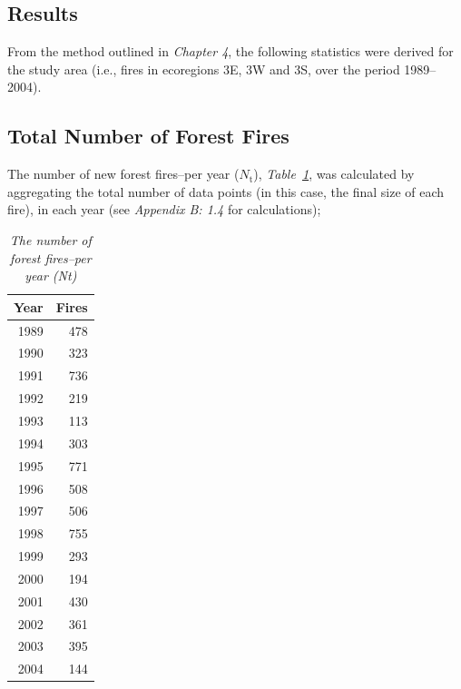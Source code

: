 \begin{spacing}{1.5}
\phantom
\phantom
\phantom
\phantom
\section{Results}
\phantom
\phantom
\noindent From the method outlined in \emph{Chapter 4}, the following statistics were derived for the study area (i.e., fires in ecoregions 3E, 3W and 3S, over the period 1989--2004).

\subsection{Total Number of Forest Fires}

The number of new forest fires--per year ($N_{\mathrm{t}}$), \emph{Table~\ref{tab3}}, was calculated by aggregating the total number of data points (in this case, the final size of each fire), in each year (see \emph{Appendix B: 1.4} for calculations); \\





\begin{table}[ht]
\begin{center}
\begin{tabular}{|r|r|}
  \hline
Year & Fires \\ 
  \hline
1989 & 478 \\ 
  1990 & 323 \\ 
  1991 & 736 \\ 
  1992 & 219 \\ 
  1993 & 113 \\ 
  1994 & 303 \\ 
  1995 & 771 \\ 
  1996 & 508 \\ 
  1997 & 506 \\ 
  1998 & 755 \\ 
  1999 & 293 \\ 
  2000 & 194 \\ 
  2001 & 430 \\ 
  2002 & 361 \\ 
  2003 & 395 \\ 
  2004 & 144 \\ 
   \hline
\end{tabular}
\caption[The number of forest fires--per year (Nt)]{\emph{The number of forest fires--per year (Nt)}}
\label{tab3}
\end{center}
\end{table}


\end{spacing}
